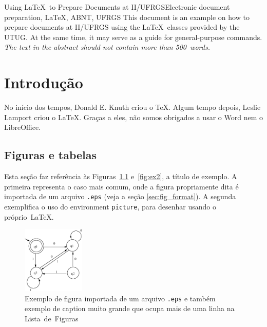 \documentclass[pgmicro,tese]{iiufrgs}
\begin{document}
\begin{englishabstract}{Using \LaTeX\ to Prepare Documents at II/UFRGS}{Electronic document preparation, \LaTeX, ABNT, UFRGS}
This document is an example on how to prepare documents at II/UFRGS
using the \LaTeX\ classes provided by the UTUG\@. At the same time, it
may serve as a guide for general-purpose commands. \emph{The text in
the abstract should not contain more than 500~words.}
\end{englishabstract}


\chapter{Introdução}
No início dos tempos, Donald E. Knuth criou o \TeX. Algum tempo depois, Leslie Lamport criou o \LaTeX. Graças a eles, não somos obrigados a usar o Word nem o LibreOffice.

\section{Figuras e tabelas}
Esta seção faz referência às Figuras~\ref{fig:ex1} e~\ref{fig:ex2}, a título de exemplo. A primeira representa o caso mais comum, onde a figura propriamente dita é importada de um arquivo \texttt{.eps} (veja a seção \ref{sec:fig_format}). A segunda exemplifica o uso do environment \texttt{picture}, para desenhar usando o próprio~\LaTeX.

\begin{figure}
        \centerline{\includegraphics[width=8em]{fig.eps}}
        \caption{Exemplo de figura importada de um arquivo \texttt{.eps} e também exemplo de caption muito grande que ocupa mais de uma linha na Lista~de~Figuras}
        \label{fig:ex1}
\end{figure}
\end{document}
